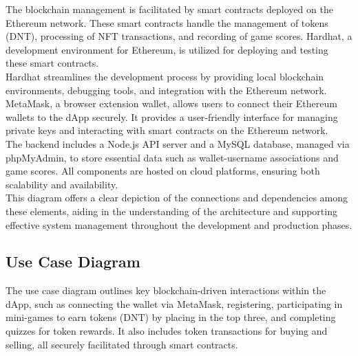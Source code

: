 \documentclass[main.tex]{subfiles}
\begin{document}
The blockchain management is facilitated by smart contracts deployed on the Ethereum network. These smart contracts handle the management of tokens (DNT), processing 
of NFT transactions, and recording of game scores. Hardhat, a development environment for Ethereum, is utilized for deploying and testing these smart contracts.\\

Hardhat streamlines the development process by providing local blockchain environments, debugging tools, and integration with the Ethereum network.\\

MetaMask, a browser extension wallet, allows users to connect their Ethereum wallets to the dApp securely. It provides a user-friendly interface for managing private 
keys and interacting with smart contracts on the Ethereum network.\\

The backend includes a Node.js API server and a MySQL database, managed via phpMyAdmin, to store essential data such as wallet-username associations and game scores. 
All components are hosted on cloud platforms, ensuring both scalability and availability.\\

This diagram offers a clear depiction of the connections and dependencies among these elements, aiding in the understanding of the architecture and supporting 
effective system management throughout the development and production phases.

\subsection{Use Case Diagram}
The use case diagram outlines key blockchain-driven interactions within the dApp, such as connecting the wallet via MetaMask, registering, participating in mini-games
 to earn tokens (DNT) by placing in the top three, and completing quizzes for token rewards. It also includes token transactions for buying and selling, all securely 
 facilitated through smart contracts.
\end{document}
